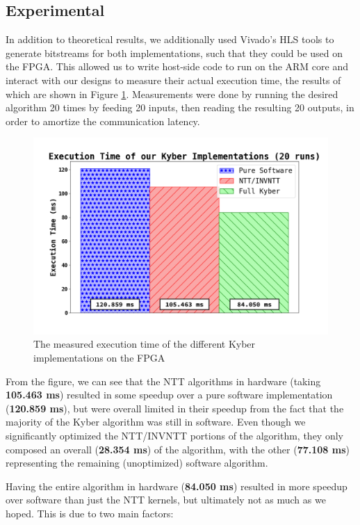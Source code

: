 
\subsection*{Experimental}

In addition to theoretical results, we additionally used
Vivado's HLS tools to generate bitstreams for both
implementations, such that they could be used on the FPGA.
This allowed us to write host-side code to run on the ARM
core and interact with our designs to measure their actual
execution time, the results of which are shown in Figure
\ref{fig:results-exp-time}. Measurements were done by running
the desired algorithm 20 times by feeding 20 inputs, then
reading the resulting 20 outputs, in order to amortize the
communication latency.

\begin{figure}[H]
  \centering
  \includegraphics[width=0.5\linewidth]{imgs/results-exp-time.png}
  \caption{
    The measured execution time of the different Kyber
    implementations on the FPGA
  }
  \label{fig:results-exp-time}
\end{figure}

From the figure, we can see that the NTT algorithms in hardware
(taking \textbf{105.463 ms}) resulted in some speedup over a pure
software implementation (\textbf{120.859 ms}), but were overall
limited in their speedup from the fact that the majority of the
Kyber algorithm was still in software. Even though we significantly
optimized the NTT/INVNTT portions of the algorithm, they only
composed an overall (\textbf{28.354 ms}) of the algorithm, with
the other (\textbf{77.108 ms}) representing the remaining (unoptimized)
software algorithm.

Having the entire algorithm in hardware (\textbf{84.050 ms}) resulted
in more speedup over software than just the NTT kernels, but ultimately
not as much as we hoped. This is due to two main factors:

